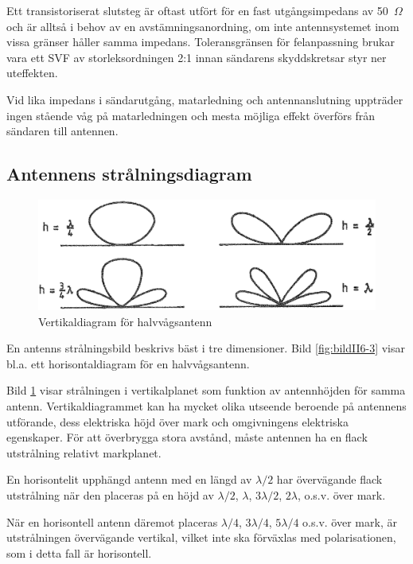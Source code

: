 Ett transistoriserat slutsteg är oftast utfört för en fast utgångsimpedans av
50~\(\Omega\) och är alltså i behov av en avstämningsanordning, om inte
antennsystemet inom vissa gränser håller samma impedans.
Toleransgränsen för felanpassning brukar vara ett SVF av storleksordningen 2:1
innan sändarens skyddskretsar styr ner uteffekten.

Vid lika impedans i sändarutgång, matarledning och antennanslutning
uppträder ingen stående våg på matarledningen och mesta möjliga effekt
överförs från sändaren till antennen.

\subsection{Antennens strålningsdiagram}

\begin{figure}
  \includegraphics[width=\textwidth]{images/cropped_pdfs/bild_2_6-05.pdf}
  \caption{Vertikaldiagram för halvvågsantenn}
  \label{fig:bildII6-5}
\end{figure}

En antenns strålningsbild beskrivs bäst i tre dimensioner.
Bild \ref{fig:bildII6-3} visar bl.a. ett horisontaldiagram för en
halvvågsantenn.

Bild \ref{fig:bildII6-5} visar strålningen i vertikalplanet som funktion av
antennhöjden för samma antenn.
Vertikaldiagrammet kan ha mycket olika utseende beroende på antennens utförande,
dess elektriska höjd över mark och omgivningens elektriska egenskaper.
För att överbrygga stora avstånd, måste antennen ha en flack utstrålning
relativt markplanet.

En horisontelit upphängd antenn med en längd av \(\lambda/2\) har övervägande
flack utstrålning när den placeras på en höjd av \(\lambda/2\), \(\lambda\),
\(3\lambda/2\), \(2\lambda\), o.s.v. över mark.

När en horisontell antenn däremot placeras \(\lambda/4\), \(3\lambda/4\),
\(5\lambda/4\) o.s.v. över mark, är utstrålningen övervägande vertikal, vilket
inte ska förväxlas med polarisationen, som i detta fall är horisontell.

